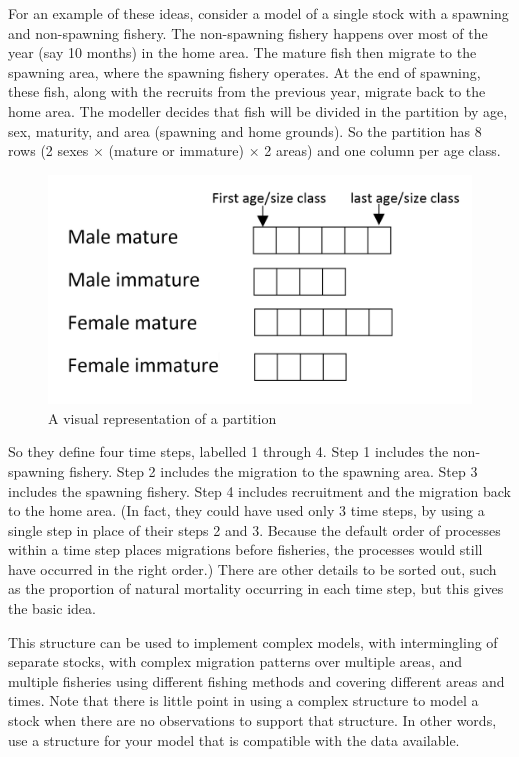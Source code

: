 For an example of these ideas, consider a model of a single stock with a spawning and non-spawning fishery. The non-spawning fishery happens over most of the year (say 10 months) in the home area. The mature fish then migrate to the spawning area, where the spawning fishery operates. At the end of spawning, these fish, along with the recruits from the previous year, migrate back to the home area. The modeller decides that fish will be divided in the partition by age, sex, maturity, and area (spawning and home grounds). So the partition has 8 rows (2 sexes × (mature or immature) × 2 areas) and one column per age class. 
\begin{figure}[H]\label{Fig:part}
	\centering
	\includegraphics[scale=0.3]{Figures/partition.png}
		\caption{A visual representation of a partition}
\end{figure}


So they define four time steps, labelled 1 through 4. Step 1 includes the non-spawning fishery. Step 2 includes the migration to the spawning area. Step 3 includes the spawning fishery. Step 4 includes recruitment and the migration back to the home area. (In fact, they could have used only 3 time steps, by using a single step in place of their steps 2 and 3. Because the default order of processes within a time step places migrations before fisheries, the processes would still have occurred in the right order.) There are other details to be sorted out, such as the proportion of natural mortality occurring in each time step, but this gives the basic idea. 

This structure can be used to implement complex models, with intermingling of separate stocks, with complex migration patterns over multiple areas, and multiple fisheries using different fishing methods and covering different areas and times. Note that there is little point in using a complex structure to model a stock when there are no observations to support that structure. In other words, use a structure for your model that is compatible with the data available. 

